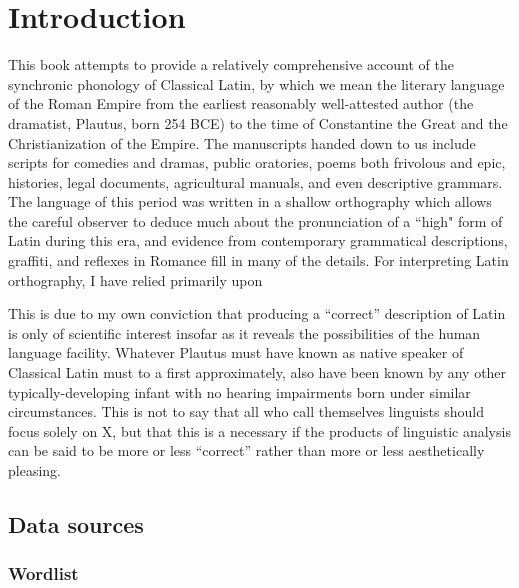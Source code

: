 \chapter{Introduction}

This book attempts to provide a relatively comprehensive account of the synchronic phonology of Classical Latin, by which we mean the literary language of the Roman Empire from the earliest reasonably well-attested author (the dramatist, Plautus, born 254 BCE) to the time of Constantine the Great and the Christianization of the Empire.
The manuscripts handed down to us include scripts for comedies and dramas, public oratories, poems both frivolous and epic, histories, legal documents, agricultural manuals, and even descriptive grammars.
The language of this period was written in a shallow orthography which allows the careful observer to deduce much about the pronunciation of a ``high" form of Latin during this era, and evidence from contemporary grammatical descriptions, graffiti, and reflexes in Romance fill in many of the details. 
For interpreting Latin orthography, I have relied primarily upon \citet{Allen1978}

This is due to my own conviction that producing a ``correct'' description of Latin is only of scientific interest insofar as it reveals the possibilities of the human language facility. 
Whatever Plautus must have known as native speaker of Classical Latin must to a first approximately, also have been known by any other typically-developing infant with no hearing impairments born under similar circumstances.
This is not to say that all who call themselves linguists should focus solely on X, but that this is a necessary if the products of linguistic analysis can be said to be more or less ``correct'' rather than more or less aesthetically pleasing.


\section{Data sources}


\subsection{Wordlist}



